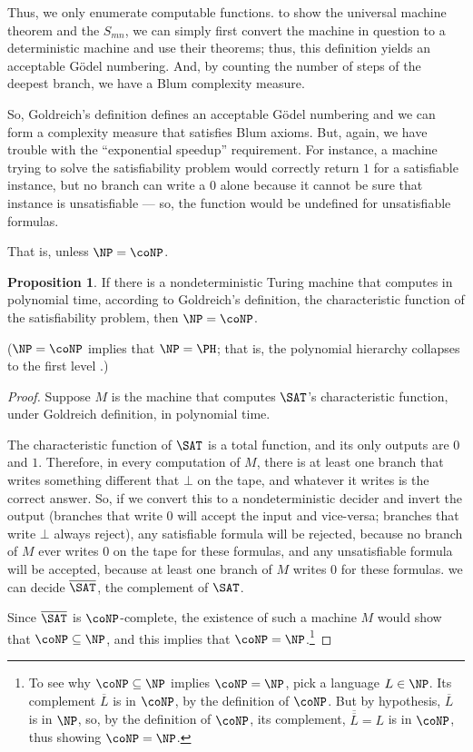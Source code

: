 \documentclass[12pt]{article}
\theoremstyle{definition}
\newtheorem{proposition}[definition]{Proposition}
\begin{document}
Thus, we only enumerate computable functions.
to show the universal machine theorem and the $S_{mn}$,
we can simply first convert the machine in question to a deterministic machine
and use their theorems;
thus, this definition yields an acceptable Gödel numbering.
And, by counting the number of steps of the deepest branch,
we have a Blum complexity measure.

So, Goldreich's definition defines an acceptable Gödel numbering
and we can form a complexity measure that satisfies Blum axioms.
But, again,
we have trouble with the ``exponential speedup'' requirement.
For instance,
a machine trying to solve the satisfiability problem
would correctly return $1$ for a satisfiable instance,
but no branch can write a $0$ alone
because it cannot be sure that instance is unsatisfiable
--- so, the function would be undefined for unsatisfiable formulas.

That is, unless $\NP = \coNP$.

\begin{proposition}
    If there is a nondeterministic Turing machine
    that computes in polynomial time, according to Goldreich's definition,
    the characteristic function of the satisfiability problem,
    then $\NP = \coNP$.
\end{proposition}

($\NP = \coNP$ implies that $\NP = \PH$; that is,
the polynomial hierarchy collapses to the first level \cite[p.~280]{Kozen2006}.)

\begin{proof}
    Suppose $M$ is the machine that computes $\SAT$'s characteristic function,
    under Goldreich definition, in polynomial time.

    The characteristic function of $\SAT$ is a total function,
    and its only outputs are $0$ and $1$.
    Therefore, in every computation of $M$,
    there is at least one branch that writes something different that $\bot$ on the tape,
    and whatever it writes is the correct answer.
    So, if we convert this to a nondeterministic decider and invert the output
    (branches that write $0$ will accept the input and vice-versa;
    branches that write $\bot$ always reject),
    any satisfiable formula will be rejected,
    because no branch of $M$ ever writes $0$ on the tape for these formulas,
    and any unsatisfiable formula will be accepted,
    because at least one branch of $M$ writes $0$ for these formulas.
    we can decide $\overline \SAT$, the complement of $\SAT$.

    Since $\overline \SAT$ is $\coNP$-complete,
    the existence of such a machine $M$
    would show that $\coNP \subseteq \NP$,
    and this implies that $\coNP = \NP$.\footnote{
        To see why $\coNP \subseteq \NP$ implies $\coNP = \NP$,
        pick a language $L \in \NP$.
        Its complement $\overline L$ is in $\coNP$, by the definition of $\coNP$.
        But by hypothesis, $\overline L$ is in $\NP$,
        so, by the definition of $\coNP$,
        its complement, $\overline{\overline L} = L$ is in $\coNP$,
        thus showing $\coNP = \NP$.
    }
\end{proof}
\end{document}
